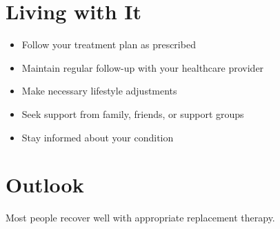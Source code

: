 \section{Living with It}
\begin{itemize}[noitemsep]
  \item Follow your treatment plan as prescribed
  \item Maintain regular follow-up with your healthcare provider
  \item Make necessary lifestyle adjustments
  \item Seek support from family, friends, or support groups
  \item Stay informed about your condition
\end{itemize}
\section{Outlook}
Most people recover well with appropriate replacement therapy.
